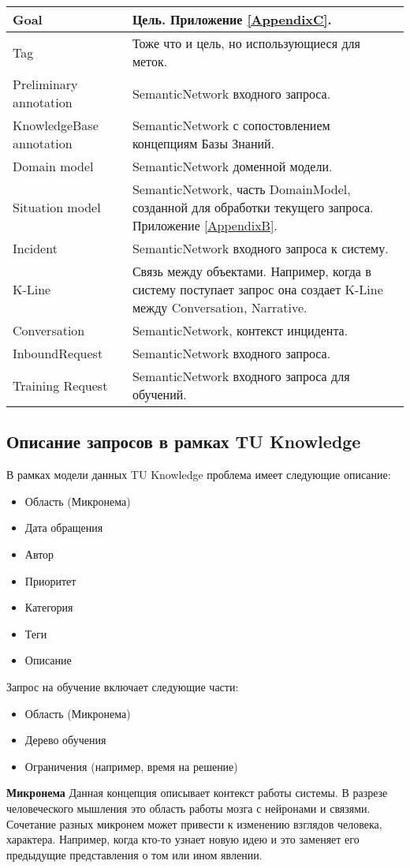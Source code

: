 \begin{longtable}{|p{5cm}|p{10cm}|}
   \hline
   Goal  & Цель. Приложение \ref{AppendixC}. \\
   \hline
   Tag & Тоже что и цель, но использующиеся для меток. \\
   \hline
   Preliminary annotation  & SemanticNetwork входного запроса. \\
   \hline
   KnowledgeBase annotation  & SemanticNetwork с сопостовлением концепциям Базы Знаний. \\
   \hline
   Domain model  & SemanticNetwork доменной модели. \\
   \hline
   Situation model  & SemanticNetwork, часть DomainModel, созданной для обработки текущего запроса. Приложение \ref{AppendixB}. \\
   \hline
   Incident  & SemanticNetwork входного запроса к систему. \\
   \hline
   K-Line  & Связь между объектами. Например, когда в систему поступает запрос она создает K-Line между Conversation, Narrative. \\
   \hline
   Conversation  & SemanticNetwork, контекст инцидента. \\
   \hline
   InboundRequest  & SemanticNetwork входного запроса. \\
   \hline
   Training Request  & SemanticNetwork входного запроса для обучений. \\
   \hline
   
  \end{longtable}

\subsection{Описание запросов в рамках TU Knowledge}
В рамках модели данных TU Knowledge проблема имеет следующие описание:
\begin{itemize}
	\item Область (Микронема)
	\item Дата обращения
	\item Автор
	\item Приоритет
	\item Категория
	\item Теги
	\item Описание
\end{itemize}
Запрос на обучение включает следующие части:
\begin{itemize}
	\item Область (Микронема)
	\item Дерево обучения
	\item Ограничения (например, время на решение)
\end{itemize}
\textbf{Микронема}
Данная концепция описывает контекст работы системы. В разрезе человеческого мышления это область работы мозга с нейронами и связями. Сочетание разных микронем может привести к изменению взглядов человека, характера. Например, когда кто-то узнает новую идею и это заменяет его предыдущие представления о том или ином явлении.  
